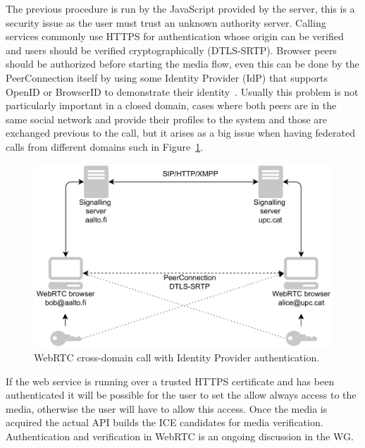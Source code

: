 The previous procedure is run by the JavaScript provided by the server, this is a security issue as the user must trust an unknown authority server. Calling services commonly use HTTPS for authentication whose origin can be verified and users should be verified cryptographically (DTLS-SRTP). Browser peers should be authorized before starting the media flow, even this can be done by the PeerConnection itself by using some Identity Provider (IdP) that supports OpenID or BrowserID to demonstrate their identity~\cite{rtcwebSecurityArchIETF}. Usually this problem is not particularly important in a closed domain, cases where both peers are in the same social network and provide their profiles to the system and those are exchanged previous to the call, but it arises as a big issue when having federated calls from different domains such in Figure~\ref{fig:idpWebRTCcall}.

 \begin{figure}[h]
  \centering
    \includegraphics[width=1\textwidth]{./figures/idpWebRTCcall.pdf}
      \caption[WebRTC cross-domain call with Identity Provider authentication]{WebRTC cross-domain call with Identity Provider authentication.}
	\label{fig:idpWebRTCcall}
\end{figure}

If the web service is running over a trusted HTTPS certificate and has been authenticated it will be possible for the user to set the allow always access to the media, otherwise the user will have to allow this access. Once the media is acquired the actual API builds the ICE candidates for media verification. Authentication and verification in WebRTC is an ongoing discussion in the WG.

